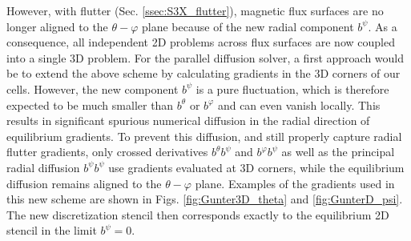 However, with flutter (Sec. \ref{ssec:S3X_flutter}), magnetic flux surfaces are no longer aligned to the $\theta - \varphi$ plane because of the new radial component $b^\psi$. As a consequence, all independent 2D problems across flux surfaces are now coupled into a single 3D problem. For the parallel diffusion solver, a first approach would be to extend the above scheme by calculating gradients in the 3D corners of our cells. However, the new component $b^\psi$ is a pure fluctuation, which is therefore expected to be much smaller than $b^\theta$ or $b^\varphi$ and can even vanish locally. This results in significant spurious numerical diffusion in the radial direction of equilibrium gradients. To prevent this diffusion, and still properly capture radial flutter gradients, only crossed derivatives $b^\theta b^\psi$ and $b^\varphi b^\psi$ as well as the principal radial diffusion $b^\psi b^\psi$ use gradients evaluated at 3D corners, while the equilibrium diffusion remains aligned to the $\theta - \varphi$ plane. Examples of the gradients used in this new scheme are shown in Figs. \ref{fig:Gunter3D_theta} and \ref{fig:GunterD_psi}. The new discretization stencil then corresponds exactly to the equilibrium 2D stencil in the limit $b^\psi=0$. \newline

